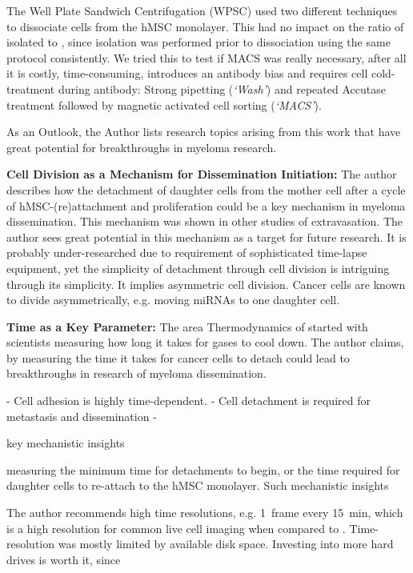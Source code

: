 The Well Plate
Sandwich Centrifugation (WPSC) used two different techniques to dissociate
\MAina cells from the hMSC monolayer. This had no impact on the ratio of
isolated \MAina to \nMAina, since \nMAina isolation was performed prior to
dissociation using the same protocol consistently. We tried this to test if MACS
was really necessary, after all it is costly, time-consuming, introduces an antibody bias
and requires cell cold-treatment during antibody: Strong pipetting
(\emph{`Wash'}) and repeated Accutase treatment followed by magnetic activated
cell sorting (\emph{`MACS'}).





\label{sec:discussion_potential_breakthroughs}
As an Outlook, the Author lists research topics arising from this work that have
great potential for breakthroughs in myeloma research.

\textbf{Cell Division as a Mechanism for Dissemination Initiation:}
The author describes how the detachment of daughter cells from the mother cell
after a cycle of hMSC-(re)attachment and proliferation could be a key mechanism
in myeloma dissemination. This mechanism was shown in other studies of
extravasation. The author sees great potential in this mechanism as a target for
future research. It is probably under-researched due to requirement of
sophisticated time-lapse equipment, yet the simplicity of detachment through
cell division is intriguing through its simplicity. It implies asymmetric cell
division. Cancer cells are known to divide asymmetrically, e.g. moving miRNAs to
one daughter cell.

\textbf{Time as a Key Parameter:}
The area Thermodynamics of started with scientists measuring how long it takes
for gases to cool down. The author claims, by measuring the time it takes for
cancer cells to detach could lead to breakthroughs in research of myeloma
dissemination.

- Cell adhesion is highly time-dependent.
- Cell detachment is required for metastasis and dissemination
-

key mechanistic insights

measuring the minimum time
for detachments to begin, or the time required for daughter cells to re-attach
to the hMSC monolayer. Such mechanistic insights

The author recommends high time resolutions, e.g. \SI{1}{frame} every
\SI{15}{\minute}, which is a high resolution for common live cell imaging
when compared to \citet{purschkePhototoxicityHoechst333422010}. Time-resolution was mostly
limited by available disk space. Investing into more hard drives is worth it,
since

